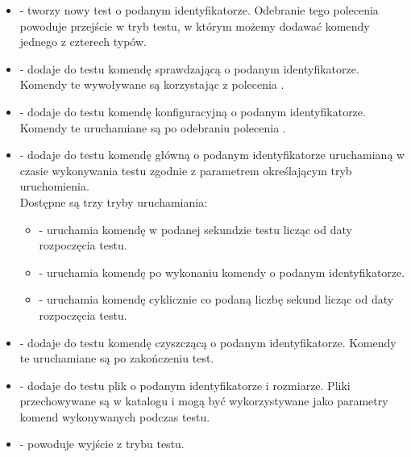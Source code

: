 \documentclass[00-praca-magisterska.tex]{subfiles}
\begin{document}
\begin{itemize}
  \setlength{\itemsep}{10pt}

\item{ - tworzy nowy test o podanym
identyfikatorze. Odebranie tego polecenia powoduje przejście w tryb testu, w
którym możemy dodawać komendy jednego z czterech typów.}

\item{ - dodaje do testu komendę
sprawdzającą o podanym identyfikatorze. Komendy te wywoływane są korzystając z
polecenia .}

\item{ - dodaje do testu komendę
konfiguracyjną o podanym identyfikatorze. Komendy te uruchamiane są po odebraniu
polecenia .}

\item{ -
dodaje do testu komendę główną o podanym identyfikatorze uruchamianą w czasie
wykonywania testu zgodnie z parametrem określającym tryb uruchomienia. \\

Dostępne są trzy tryby uruchamiania: \\

\begin{itemize}
  \setlength{\itemsep}{10pt}

\item{ - uruchamia komendę w podanej sekundzie testu licząc
od daty rozpoczęcia testu.}
\item{ - uruchamia komendę po wykonaniu komendy o
podanym identyfikatorze.} 
\item{ - uruchamia komendę cyklicznie co podaną liczbę
sekund licząc od daty rozpoczęcia testu.}

\end{itemize}}

\item{ - dodaje do testu komendę
czyszczącą o podanym identyfikatorze. Komendy te uruchamiane są po zakończeniu
test.}

\item{ - dodaje do testu
plik o podanym identyfikatorze i rozmiarze. Pliki przechowywane są w katalogu
 i mogą być wykorzystywane jako parametry komend wykonywanych podczas
testu.}

\item{ - powoduje wyjście z trybu testu.}

\end{itemize}
\end{document}
